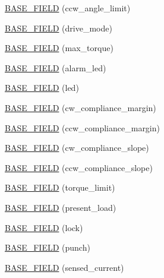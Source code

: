 \begin{DoxyCompactItemize}
\item 
\hyperlink{classdynamixel_1_1servos_1_1_base_servo_ac18bbfd90b36bc38b484f250e0e73395}{B\+A\+S\+E\+\_\+\+F\+I\+E\+L\+D} (ccw\+\_\+angle\+\_\+limit)
\item 
\hyperlink{classdynamixel_1_1servos_1_1_base_servo_a66d87963957d700b0cb3e5489280102d}{B\+A\+S\+E\+\_\+\+F\+I\+E\+L\+D} (drive\+\_\+mode)
\item 
\hyperlink{classdynamixel_1_1servos_1_1_base_servo_abfb2b375965a742dae13df7324a340a9}{B\+A\+S\+E\+\_\+\+F\+I\+E\+L\+D} (max\+\_\+torque)
\item 
\hyperlink{classdynamixel_1_1servos_1_1_base_servo_a6590f524917293ab98556346bac1981f}{B\+A\+S\+E\+\_\+\+F\+I\+E\+L\+D} (alarm\+\_\+led)
\item 
\hyperlink{classdynamixel_1_1servos_1_1_base_servo_a70470a70099add231dd287d5b69a3e05}{B\+A\+S\+E\+\_\+\+F\+I\+E\+L\+D} (led)
\item 
\hyperlink{classdynamixel_1_1servos_1_1_base_servo_abe0a74eeee4b456096d1ae2a114d91c2}{B\+A\+S\+E\+\_\+\+F\+I\+E\+L\+D} (cw\+\_\+compliance\+\_\+margin)
\item 
\hyperlink{classdynamixel_1_1servos_1_1_base_servo_aab9dc28556b2f869338111a3169829d9}{B\+A\+S\+E\+\_\+\+F\+I\+E\+L\+D} (ccw\+\_\+compliance\+\_\+margin)
\item 
\hyperlink{classdynamixel_1_1servos_1_1_base_servo_a3b9a6dda5ecd09debc17fe9fb72d255b}{B\+A\+S\+E\+\_\+\+F\+I\+E\+L\+D} (cw\+\_\+compliance\+\_\+slope)
\item 
\hyperlink{classdynamixel_1_1servos_1_1_base_servo_a84e568db5fcd8725ace1873c56545e39}{B\+A\+S\+E\+\_\+\+F\+I\+E\+L\+D} (ccw\+\_\+compliance\+\_\+slope)
\item 
\hyperlink{classdynamixel_1_1servos_1_1_base_servo_a33d2a6eed08c33fc4786404dd5399daa}{B\+A\+S\+E\+\_\+\+F\+I\+E\+L\+D} (torque\+\_\+limit)
\item 
\hyperlink{classdynamixel_1_1servos_1_1_base_servo_aa2e7a577c80aea887b05b53c76578acf}{B\+A\+S\+E\+\_\+\+F\+I\+E\+L\+D} (present\+\_\+load)
\item 
\hyperlink{classdynamixel_1_1servos_1_1_base_servo_a6a1cc09047bac429e7b50cf69a59e2e7}{B\+A\+S\+E\+\_\+\+F\+I\+E\+L\+D} (lock)
\item 
\hyperlink{classdynamixel_1_1servos_1_1_base_servo_ab9dde35a6228cfe48b2a58b0ab679de5}{B\+A\+S\+E\+\_\+\+F\+I\+E\+L\+D} (punch)
\item 
\hyperlink{classdynamixel_1_1servos_1_1_base_servo_a13f8ab07c4c2274c9b0191c7bb43a159}{B\+A\+S\+E\+\_\+\+F\+I\+E\+L\+D} (sensed\+\_\+current)

\end{DoxyCompactItemize}
